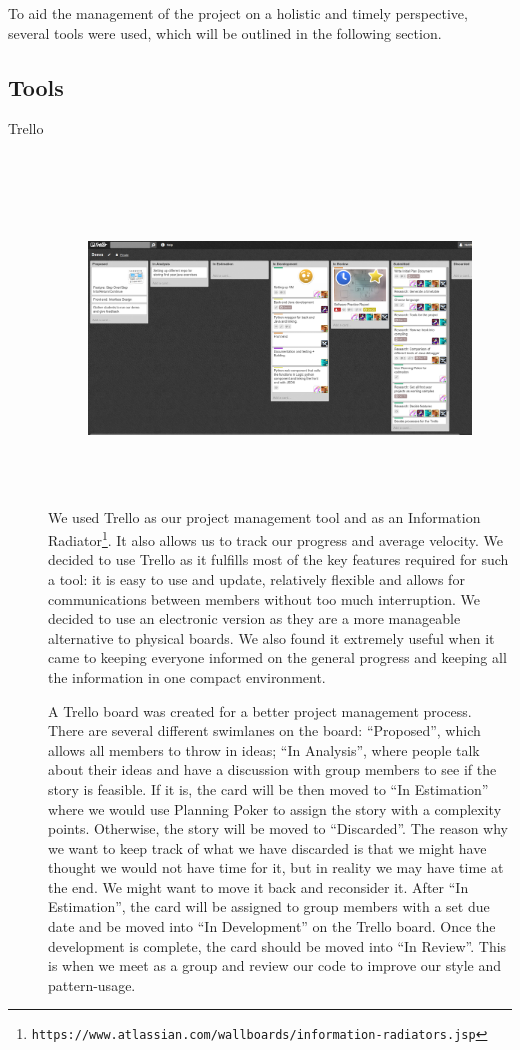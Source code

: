 \documentclass[11pt, a4paper]{article}
\begin{document}
To aid the management of the project on a holistic and timely perspective, several tools were used, which will be outlined in the following section.

\subsection{Tools}
\begin{description}

\item[Trello] \hfill \\
\begin{figure}[h!]
\centering
\includegraphics[height=80mm,width=130mm]{Trello.png}
\end{figure}

We used Trello as our project management tool and as an Information Radiator\footnote{\tt{https://www.atlassian.com/wallboards/information-radiators.jsp}}.
It also allows us to track our progress and average velocity. 
We decided to use Trello as it fulfills most of the key features required for such a tool: it is easy to use and update, relatively flexible and allows for communications between members without too much interruption. 
We decided to use an electronic version as they are a more manageable alternative to physical boards. 
We also found it extremely useful when it came to keeping everyone informed on the general progress and keeping all the information in one compact environment.

A Trello board was created for a better project management process. 
There are several different swimlanes on the board: ``Proposed'', which allows all members to throw in ideas; ``In Analysis'', where people talk about their ideas and have a discussion with group members to see if the story is feasible. 
If it is, the card will be then moved to ``In Estimation'' where we would use Planning Poker to assign the story with a complexity points.
Otherwise, the story will be moved to ``Discarded''.
The reason why we want to keep track of what we have discarded is that we might have thought we would not have time for it, but in reality we may have time at the end.
We might want to move it back and reconsider it. 
After ``In Estimation'', the card will be assigned to group members with a set due date and be moved into ``In Development'' on the Trello board. 
Once the development is complete, the card should be moved into ``In Review''. 
This is when we meet as a group and review our code to improve our style and pattern-usage.


\end{description}
\end{document}
